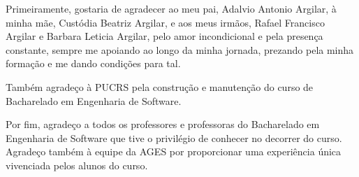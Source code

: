 \begin{agradecimentos}
  Primeiramente, gostaria de agradecer ao meu pai, Adalvio Antonio Argilar, à minha mãe, Custódia Beatriz Argilar, e aos meus irmãos, Rafael Francisco Argilar e Barbara Leticia Argilar, pelo amor incondicional e pela presença constante, sempre me apoiando ao longo da minha jornada, prezando pela minha formação e me dando condições para tal.

Também agradeço à PUCRS pela construção e manutenção do curso de Bacharelado em Engenharia de Software.

Por fim, agradeço a todos os professores e professoras do Bacharelado em Engenharia de Software que tive o privilégio de conhecer no decorrer do curso. Agradeço também à equipe da AGES por proporcionar uma experiência única vivenciada pelos alunos do curso.
\vfill
\end{agradecimentos}